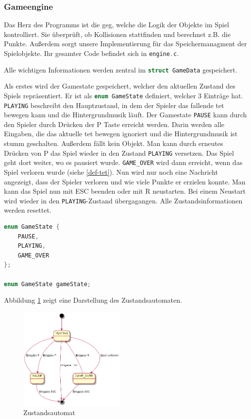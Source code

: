 \documentclass[11pt]{article}
\newcommand{\lstin}[1]{\lstinline[language=C]{#1}}
\newcommand{\refabb}[1]{Abbildung \ref{#1}}
\begin{document}
\subsubsection{Gameengine} \label{gem}

Das Herz des Programms ist die \gls{geg}, welche die Logik der Objekte im Spiel kontrolliert.
Sie überprüft, ob Kollisionen stattfinden und berechnet z.B. die Punkte. 
Außerdem sorgt unsere Implementierung für das Speichermanagment der Spielobjekte.
Ihr gesamter Code befindet sich in \lstin{engine.c}.

Alle wichtigen Informationen werden zentral im \lstin{struct GameData} gespeichert.

Als erstes wird der Gamestate gespeichert, welcher den aktuellen Zustand des Spiels repräsentiert.
Er ist als \lstin{enum GameState} definiert, welcher 3 Einträge hat. 
\lstin{PLAYING} beschreibt den Hauptzustand, in dem der Spieler das fallende \gls{tet} bewegen kann und die Hintergrundmusik läuft.
Der Gamestate \lstin{PAUSE} kann durch den Spieler durch Drücken der P Taste erreicht werden. 
Darin werden alle Eingaben, die das aktuelle \gls{tet} bewegen ignoriert und die Hintergrundmusik ist stumm geschalten. Außerdem fällt kein Objekt.
Man kann durch erneutes Drücken von P das Spiel wieder in den Zustand \lstin{PLAYING} versetzen. Das Spiel geht dort weiter, wo es pausiert wurde.
\lstin{GAME_OVER} wird dann erreicht, wenn das Spiel verloren wurde (siehe \ref{def-tet}). 
Nun wird nur noch eine Nachricht angezeigt, dass der Spieler verloren und wie viele Punkte er erzielen konnte. Man kann das Spiel nun mit ESC beenden oder mit R neustarten.
Bei einem Neustart wird wieder in den \lstin{PLAYING}-Zustand übergagangen. Alle Zustandsinformationen werden resettet.

\begin{lstlisting}[language=C]
enum GameState {
    PAUSE,
    PLAYING,
    GAME_OVER
};

enum GameState gameState;
\end{lstlisting}

\refabb{state} zeigt eine Darstellung des Zustandsautomaten.

\begin{figure}[h]
  \centering
  \includegraphics[width=200px]{../state.png}
  \caption{Zustandsautomat}
  \label{state}
\end{figure}
\end{document}
